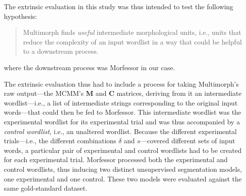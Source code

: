 {%
The extrinsic evaluation in this study was thus intended to test the following hypothesis:
\begin{quotation}\noindent
Multimorph finds \emph{useful} intermediate morphological units, i.e., units that reduce the
complexity of an input wordlist in a way that could be helpful to a downstream process.
\end{quotation}
where the downstream process was Morfessor in our case.

The extrinsic evaluation thus had to include a process for taking Multimorph's raw output---the MCMM's
$\textbf{M}$ and $\textbf{C}$ matrices, deriving from it an intermediate wordlist---i.e.,
a list of intermediate strings corresponding to the original input words---that could %
then be fed to Morfessor. 
This intermediate wordlist was the experimental wordlist for its experimental trial
and was thus accompanied by a \emph{control wordlist}, i.e., an unaltered wordlist.
Because the different experimental trials---i.e., 
the different combinations $\delta$ and $s$---covered
different sets of input words, a particular pair of experimental and control wordlists had to be created for each
experimental trial.
Morfessor processed both the experimental and control wordlists, 
thus inducing two distinct unsupervised segmentation 
models, one experimental and one control. 
These two models were evaluated
against the same gold-standard dataset. 


}
